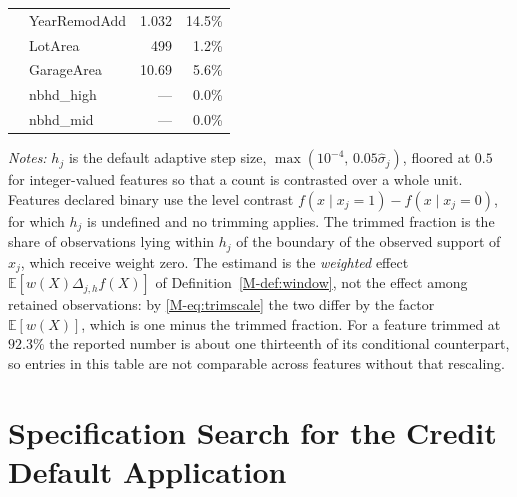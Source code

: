 \documentclass[12pt,a4paper]{article}
\numberwithin{equation}{section}
\theoremstyle{plain}
\theoremstyle{definition}
\newcommand{\E}{\mathbb{E}}
\newcommand{\Dh}{\Delta_{j,h}}
\begin{document}
\begin{table}[htbp]
\begin{threeparttable}
\begin{tabular}{llrr}
			& YearRemodAdd & 1.032 & 14.5\% \\
			& LotArea & 499 & 1.2\% \\
			& GarageArea & 10.69 & 5.6\% \\
			& nbhd\_high & --- & 0.0\% \\
			& nbhd\_mid & --- & 0.0\% \\
			\bottomrule
			\end{tabular}
			\begin{tablenotes}
			\footnotesize
			\item \textit{Notes:} $h_j$ is the default adaptive step size, $\max(10^{-4},\, 0.05\hat{\sigma}_j)$, floored at $0.5$ for integer-valued features so that a count is contrasted over a whole unit. Features declared binary use the level contrast $f(x \mid x_j=1) - f(x \mid x_j=0)$, for which $h_j$ is undefined and no trimming applies. The trimmed fraction is the share of observations lying within $h_j$ of the boundary of the observed support of $x_j$, which receive weight zero. The estimand is the \emph{weighted} effect $\E[w(X)\Dh f(X)]$ of Definition~\ref{M-def:window}, not the effect among retained observations: by \eqref{M-eq:trimscale} the two differ by the factor $\E[w(X)]$, which is one minus the trimmed fraction. For a feature trimmed at $92.3\%$ the reported number is about one thirteenth of its conditional counterpart, so entries in this table are not comparable across features without that rescaling.
			\end{tablenotes}
		\end{threeparttable}
		\end{table}

	\section{Specification Search for the Credit Default Application}
	\label{app:credit_spec}
\end{document}
